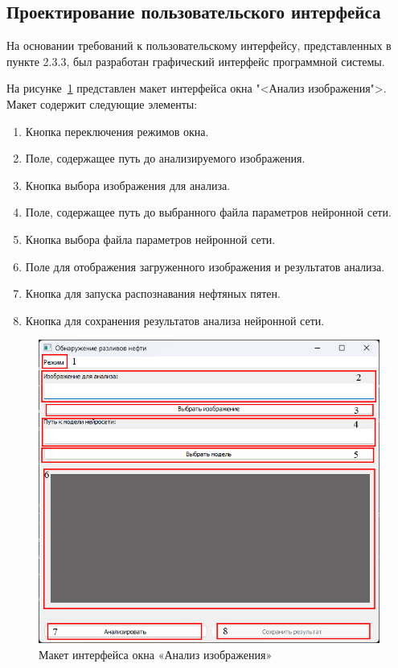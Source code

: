 \subsection{Проектирование пользовательского интерфейса}

На основании требований к пользовательскому интерфейсу, представленных в пункте 2.3.3, был разработан графический интерфейс программной системы. 

На рисунке~\ref{fig:uianalysis} представлен макет интерфейса окна "<Анализ изображения">. Макет содержит следующие элементы:

\begin{enumerate}
	\item Кнопка переключения режимов окна.
	\item Поле, содержащее путь до анализируемого изображения.
	\item Кнопка выбора изображения для анализа.
	\item Поле, содержащее путь до выбранного файла параметров нейронной сети.
	\item Кнопка выбора файла параметров нейронной сети.
	\item Поле для отображения загруженного изображения и результатов анализа.
	\item Кнопка для запуска распознавания нефтяных пятен. 
	\item Кнопка для сохранения результатов анализа нейронной сети.
\end{enumerate}

\begin{figure}[H]
	\centering
	\includegraphics[width=1\linewidth]{images/ui_analysis}
	\caption{Макет интерфейса окна «Анализ изображения»}
	\label{fig:uianalysis}
\end{figure}

